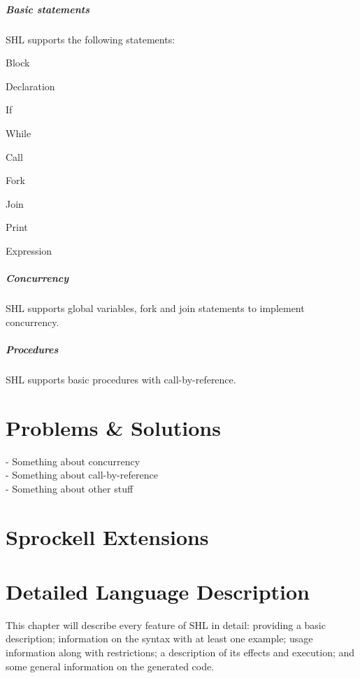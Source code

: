 \documentclass[twoside]{report}
\begin{document}
\paragraph{Basic statements} SHL supports the following statements: 
\begin{compactitem}
	\item Block
	\item Declaration
	\item If 
	\item While
	\item Call
	\item Fork 
	\item Join
	\item Print
	\item Expression
\end{compactitem}
\paragraph{Concurrency} SHL supports global variables, fork and join statements to implement concurrency.
\paragraph{Procedures} SHL supports basic procedures with call-by-reference.


\chapter{Problems \& Solutions}
\label{problems_and_solutions}

- Something about concurrency\\
- Something about call-by-reference\\
- Something about other stuff


\chapter{Sprockell Extensions}
\label{sprockell_extensions}


\chapter{Detailed Language Description}
\label{detailed_language_description}
This chapter will describe every feature of SHL in detail: providing a basic description; information on the syntax with at least one example; usage information along with restrictions; a description of its effects and execution; and some general information on the generated code.
\end{document}
